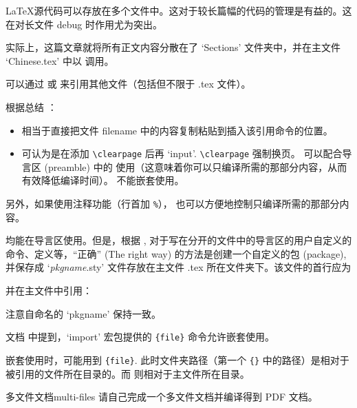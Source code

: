 \LaTeX 源代码可以存放在多个文件中。这对于较长篇幅的代码的管理是有益的。这在对长文件 debug 时作用尤为突出。

实际上，这篇文章就将所有正文内容分散在了 `Sections' 文件夹中，并在主文件 `Chinese.tex' 中以 \verb|| 调用。

可以通过 \verb|| 或 \verb|| 来引用其他文件（包括但不限于 .tex 文件）。

根据总结 \cite{input-include-tex}：
\begin{itemize}
\item \verb|| 相当于直接把文件 filename 中的内容复制粘贴到插入该引用命令的位置。
\item \verb|| 可认为是在添加 \verb|\clearpage| 后再 `input'. \verb|\clearpage| 强制换页。\verb|| 可以配合导言区 (preamble) 中的 \verb|| 使用（这意味着你可以只编译所需的那部分内容，从而有效降低编译时间）。\verb|| 不能嵌套使用。
\end{itemize}
另外，如果使用注释功能（行首加 \verb|%|），\verb|| 也可以方便地控制只编译所需的那部分内容。

\verb|| \verb|| 均能在导言区使用。但是，根据 \cite{input-include-overleaf}, 对于写在分开的文件中的导言区的用户自定义的命令、定义等，“正确” (The right way) 的方法是创建一个自定义的包 (package), 并保存成 `\emph{pkgname}.sty' 文件存放在主文件 .tex 所在文件夹下。该文件的首行应为
\begin{texlst}
\end{texlst}
并在主文件中引用：
\begin{texlst}[numbers=none]
\usepackage{pkgname}
\end{texlst}
注意自命名的 `pkgname' 保持一致。

文档 \cite{input-include-overleaf} 中提到，`import' 宏包提供的 \verb|{file}| 命令允许嵌套使用。

嵌套使用时，可能用到 \verb|{file}|. 此时文件夹路径（第一个 \verb|{}| 中的路径）是相对于被引用的文件所在目录的。而 \verb|| 则相对于主文件所在目录。

\begin{Ex}{多文件文档}{multi-files}
请自己完成一个多文件文档并编译得到 PDF 文档。
\end{Ex}